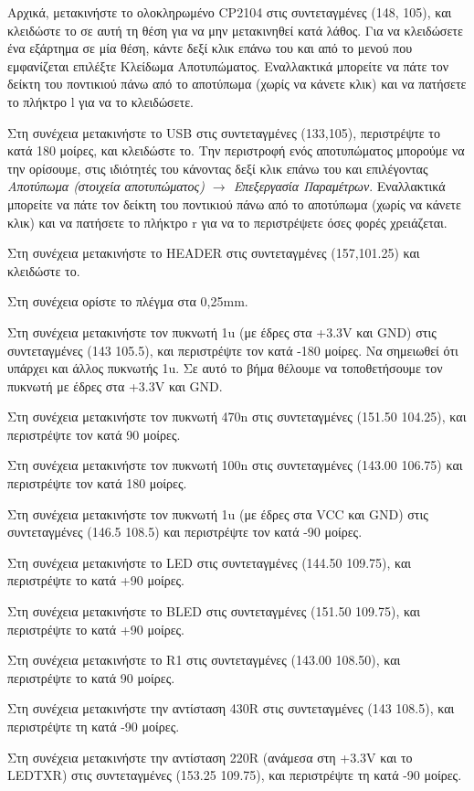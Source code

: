 \documentclass[a4paper]{article}
\begin{document}
Αρχικά, μετακινήστε το ολοκληρωμένο CP2104 στις συντεταγμένες (148, 105), και κλειδώστε το σε αυτή τη θέση για να μην μετακινηθεί κατά λάθος. Για να κλειδώσετε ένα εξάρτημα σε μία θέση, κάντε δεξί κλικ επάνω του και από το μενού που εμφανίζεται επιλέξτε Κλείδωμα Αποτυπώματος. Εναλλακτικά μπορείτε να πάτε τον δείκτη του ποντικιού πάνω από το αποτύπωμα (χωρίς να κάνετε κλικ) και να πατήσετε το πλήκτρο l για να το κλειδώσετε.

Στη συνέχεια μετακινήστε το USB στις συντεταγμένες (133,105), περιστρέψτε το κατά 180 μοίρες, και κλειδώστε το. Την περιστροφή ενός αποτυπώματος μπορούμε να την ορίσουμε, στις ιδιότητές του κάνοντας δεξί κλικ επάνω του και επιλέγοντας \textit{Αποτύπωμα (στοιχεία αποτυπώματος) $\rightarrow$ Επεξεργασία Παραμέτρων}. Εναλλακτικά μπορείτε να πάτε τον δείκτη του ποντικιού πάνω από το αποτύπωμα (χωρίς να κάνετε κλικ) και να πατήσετε το πλήκτρο r για να το περιστρέψετε όσες φορές χρειάζεται. 

Στη συνέχεια μετακινήστε το HEADER στις συντεταγμένες (157,101.25) και κλειδώστε το.

Στη συνέχεια ορίστε το πλέγμα στα 0,25mm.

Στη συνέχεια μετακινήστε τον πυκνωτή 1u (με έδρες στα +3.3V και GND) στις συντεταγμένες (143 105.5), και περιστρέψτε τον κατά -180 μοίρες. Να σημειωθεί ότι υπάρχει και άλλος πυκνωτής 1u. Σε αυτό το βήμα θέλουμε να τοποθετήσουμε τον πυκνωτή με έδρες στα +3.3V και GND.

Στη συνέχεια μετακινήστε τον πυκνωτή 470n στις συντεταγμένες (151.50 104.25), και περιστρέψτε τον κατά 90 μοίρες. 

Στη συνέχεια μετακινήστε τον πυκνωτή 100n στις συντεταγμένες (143.00 106.75) και περιστρέψτε τον κατά 180 μοίρες.

Στη συνέχεια μετακινήστε τον πυκνωτή 1u (με έδρες στα VCC και GND) στις συντεταγμένες (146.5 108.5) και περιστρέψτε τον κατά -90 μοίρες.

Στη συνέχεια μετακινήστε το LED στις συντεταγμένες (144.50 109.75), και περιστρέψτε το κατά +90 μοίρες. 

Στη συνέχεια μετακινήστε το BLED στις συντεταγμένες (151.50 109.75), και περιστρέψτε το κατά +90 μοίρες. 

Στη συνέχεια μετακινήστε το R1 στις συντεταγμένες (143.00 108.50), και περιστρέψτε το κατά  90 μοίρες. 

Στη συνέχεια μετακινήστε την αντίσταση 430R στις συντεταγμένες (143 108.5), και περιστρέψτε τη κατά -90 μοίρες. 

Στη συνέχεια μετακινήστε την αντίσταση 220R (ανάμεσα στη +3.3V και το LEDTXR) στις συντεταγμένες (153.25 109.75), και περιστρέψτε τη κατά -90 μοίρες. 
\end{document}
